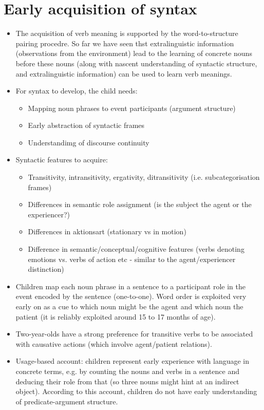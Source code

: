\documentclass{article}
\begin{document}
\section{Early acquisition of syntax}
\begin{itemize}
    \item The acquisition of verb meaning is supported by the word-to-structure pairing procedre. So far we have seen thst extralinguistic information (observations from the environment) lead to the learning of concrete nouns before these nouns (along with nascent understanding of syntactic structure, and extralinguistic information) can be used to learn verb meanings.
    \item For syntax to develop, the child needs:
    \begin{itemize}
        \item Mapping noun phrases to event participants (argument structure)
        \item Early abstraction of syntactic frames
        \item Understandimg of discourse continuity
    \end{itemize}
    \item Syntactic features to acquire:
    \begin{itemize}
        \item Transitivity, intransitivity, ergativity, ditransitivity (i.e. subcategorisation frames)
        \item Differences in semantic role assignment (is the subject the agent or the experiencer?)
        \item Differences in aktionsart (stationary vs in motion)
        \item Difference in semantic/conceptual/cognitive features (verbs denoting emotions vs. verbs of action etc - similar to the agent/experiencer distinction)
    \end{itemize}
    \item Children map each noun phrase in a sentence to a participant role in the event encoded by the sentence (one-to-one). Word order is exploited very early on as a cue to which noun might be the agent and which noun the patient (it is reliably exploited around 15 to 17 months of age).
    \item Two-year-olds have a strong preference for transitive verbs to be associated with causative actions (which involve agent/patient relations).
    \item Usage-based account: children represent early experience with language in concrete terms, e.g. by counting the nouns and verbs in a sentence and deducing their role from that (so three nouns might hint at an indirect object). According to this account, children do not have early understanding of predicate-argument structure.

\end{itemize}
\end{document}
